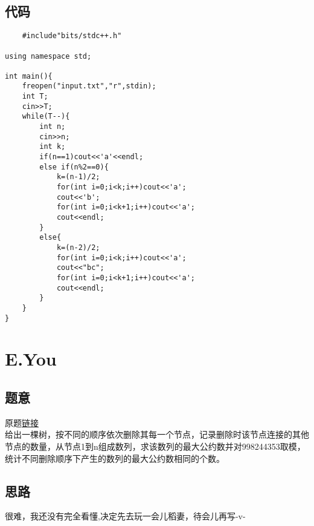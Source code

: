 \documentclass[cyan,pad,cn]{elegantnote}
\begin{document}
\subsection{代码}
\begin{lstlisting}
    #include"bits/stdc++.h"

using namespace std;

int main(){
    freopen("input.txt","r",stdin);
    int T;
    cin>>T;
    while(T--){
        int n;
        cin>>n;
        int k;
        if(n==1)cout<<'a'<<endl;
        else if(n%2==0){
            k=(n-1)/2;
            for(int i=0;i<k;i++)cout<<'a';
            cout<<'b';
            for(int i=0;i<k+1;i++)cout<<'a';
            cout<<endl;
        }
        else{
            k=(n-2)/2;
            for(int i=0;i<k;i++)cout<<'a';
            cout<<"bc";
            for(int i=0;i<k+1;i++)cout<<'a';
            cout<<endl;
        }
    }
}
\end{lstlisting}

\section{
    E.You
}

\subsection{题意}
\begin{paragraph}
    原题\href{http://codeforces.com/contest/1554/problem/E}{链接}\\
    给出一棵树，按不同的顺序依次删除其每一个节点，记录删除时该节点连接的其他节点的数量，从节点1到n组成数列，求该数列的最大公约数并对998244353取模，统计不同删除顺序下产生的数列的最大公约数相同的个数。
\end{paragraph}

\subsection{思路}
\begin{paragraph}
    很难，我还没有完全看懂,决定先去玩一会儿稻妻，待会儿再写-v-
\end{paragraph}
\end{document}
